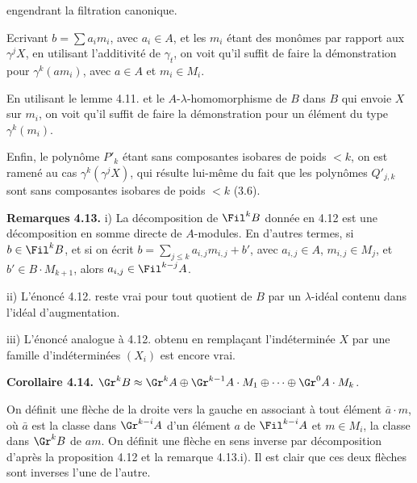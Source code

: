 engendrant la filtration canonique.

Ecrivant \(b=\sum a_i m_i\), avec \(a_i\in A\), et les \(m_i\) étant des monômes par rapport aux \(\gamma^j X\), en utilisant l'additivité de \(\gamma_t\), on voit qu'il suffit de faire la démonstration pour \(\gamma^k(am_i)\), avec \(a\in A\) et \(m_i\in M_i\).

En utilisant le lemme 4.11. et le \(A\)-\(\lambda\)-homomorphisme de \(B\) dans \(B\) qui envoie \(X\) sur \(m_i\), on voit qu'il suffit de faire la démonstration pour un élément du type \(\gamma^k(m_i)\).

Enfin, le polynôme \(P'_k\) étant sans composantes isobares de poids \(<k\), on est ramené au cas \(\gamma^k(\gamma^j X)\), qui résulte lui-même du fait que les polynômes \(Q'_{j,k}\) sont sans composantes isobares de poids \(<k\) (3.6).

\textbf{Remarques 4.13.} i) La décomposition de \(\Fil^k B\) donnée en 4.12 est une décomposition en somme directe de \(A\)-modules. En d'autres termes, si \(b\in\Fil^k B\), et si on écrit \(b=\sum_{j\le k}a_{i,j}m_{i,j}+b'\), avec \(a_{i,j}\in A\), \(m_{i,j}\in M_j\), et \(b'\in B\cdot M_{k+1}\), alors \(a_{i,j}\in\Fil^{k-j}A\).

ii) L'énoncé 4.12. reste vrai pour tout quotient de \(B\) par un \(\lambda\)-idéal contenu dans l'idéal d'augmentation.

iii) L'énoncé analogue à 4.12. obtenu en remplaçant l'indéterminée \(X\) par une famille d'indéterminées \((X_i)\) est encore vrai.

\textbf{Corollaire 4.14.} \(\Gr^k B\approx\Gr^k A\oplus\Gr^{k-1}A\cdot M_1\oplus\cdots\oplus\Gr^0 A\cdot M_k\).

On définit une flèche de la droite vers la gauche en associant à tout élément \(\bar a\cdot m\), où \(\bar a\) est la classe dans \(\Gr^{k-i}A\) d'un élément \(a\) de \(\Fil^{k-i}A\) et \(m\in M_i\), la classe dans \(\Gr^k B\) de \(am\). On définit une flèche en sens inverse par décomposition d'après la proposition 4.12 et la remarque 4.13.i). Il est clair que ces deux flèches sont inverses l'une de l'autre.

